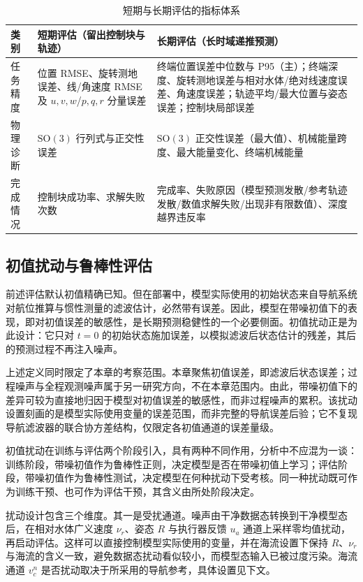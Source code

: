 \documentclass[UTF8,zihao=-4]{ctexrep}
\newcommand{\SO}{\mathrm{SO}}
\begin{document}
\begin{table}[htbp]
  \centering
  \caption{短期与长期评估的指标体系}
  \label{tab:metrics}
  \begin{tabularx}{\textwidth}{>{\raggedright\arraybackslash}p{}>{\raggedright\arraybackslash}X>{\raggedright\arraybackslash}X}
    \toprule
    类别 & 短期评估（留出控制块与轨迹） & 长期评估（长时域递推预测） \\
    \midrule
    任务精度 & 位置 RMSE、旋转测地误差、线/角速度 RMSE 及 \(u,v,w\)/\(p,q,r\) 分量误差 & 终端位置误差中位数与 P95（主）；终端深度、旋转测地误差与相对水体/绝对线速度误差、角速度误差；轨迹平均/最大位置与姿态误差；控制块局部误差 \\
    物理诊断 & \(\SO(3)\) 行列式与正交性误差 & \(\SO(3)\) 正交性误差（最大值）、机械能量跨度、最大能量变化、终端机械能量 \\
    完成情况 & 控制块成功率、求解失败次数 & 完成率、失败原因（模型预测发散/参考轨迹发散/数值求解失败/出现非有限数值）、深度越界违反率 \\
    \bottomrule
  \end{tabularx}
\end{table}

\subsection{初值扰动与鲁棒性评估}
\label{subsec:ic-perturbation}

前述评估默认初值精确已知。但在部署中，模型实际使用的初始状态来自导航系统对航位推算与惯性测量的滤波估计，必然带有误差。因此，模型在带噪初值下的表现，即对初值误差的敏感性，是长期预测稳健性的一个必要侧面。初值扰动正是为此设计：它只对 \(t=0\) 的初始状态施加误差，以模拟滤波后状态估计的残差，其后的预测过程不再注入噪声。

上述定义同时限定了本章的考察范围。本章聚焦初值误差，即滤波后状态误差；过程噪声与全程观测噪声属于另一研究方向，不在本章范围内。由此，带噪初值下的差异可较为直接地归因于模型对初值误差的敏感性，而非过程噪声的累积。该扰动设置刻画的是模型实际使用变量的误差范围，而非完整的导航误差后验；它不复现导航滤波器的联合协方差结构，仅限定各初值通道的误差量级。

初值扰动在训练与评估两个阶段引入，具有两种不同作用，分析中不应混为一谈：训练阶段，带噪初值作为鲁棒性正则，决定模型是否在带噪初值上学习；评估阶段，带噪初值作为鲁棒性测试，决定模型在何种扰动下受考核。同一种扰动既可作为训练干预、也可作为评估干预，其含义由所处阶段决定。

扰动设计包含三个维度。其一是受扰通道。噪声由干净数据态转换到干净模型态后，在相对水体广义速度 \(\nu_r\)、姿态 \(R\) 与执行器反馈 \(u_a\) 通道上采样零均值扰动，再启动评估。这样可以直接控制模型实际使用的变量，并在海流设置下保持 \(R\)、\(\nu_r\) 与海流的含义一致，避免数据态扰动看似较小，而模型态输入已被过度污染。海流通道 \(v_c^n\) 是否扰动取决于所采用的导航参考，具体设置见下文。
\end{document}
